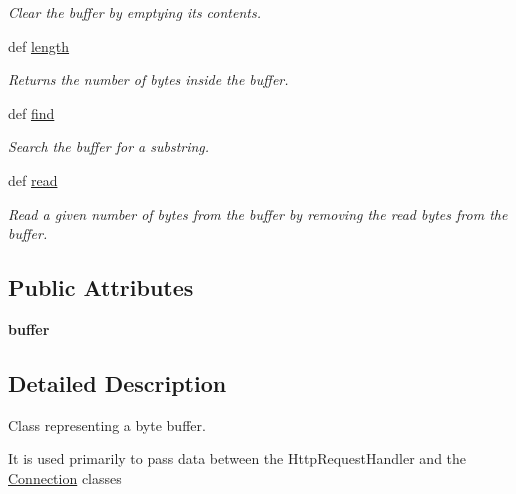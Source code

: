 \begin{DoxyCompactItemize}
\begin{DoxyCompactList}\small\item\em Clear the buffer by emptying its contents. \end{DoxyCompactList}\item 
def \hyperlink{class_connection_manager_1_1_buffer_ae3d52408d0580093d8e7fdcb33a08d73}{length}
\begin{DoxyCompactList}\small\item\em Returns the number of bytes inside the buffer. \end{DoxyCompactList}\item 
def \hyperlink{class_connection_manager_1_1_buffer_a19dfa227ce76299c4b322be6c2fc6673}{find}
\begin{DoxyCompactList}\small\item\em Search the buffer for a substring. \end{DoxyCompactList}\item 
def \hyperlink{class_connection_manager_1_1_buffer_a08de35576de23a84dcd331a5154650bf}{read}
\begin{DoxyCompactList}\small\item\em Read a given number of bytes from the buffer by removing the read bytes from the buffer. \end{DoxyCompactList}\end{DoxyCompactItemize}
\subsection*{Public Attributes}
\begin{DoxyCompactItemize}
\item 
\hypertarget{class_connection_manager_1_1_buffer_a1aa7279467377362cd54f3041e6df72e}{{\bfseries buffer}}\label{class_connection_manager_1_1_buffer_a1aa7279467377362cd54f3041e6df72e}

\end{DoxyCompactItemize}


\subsection{Detailed Description}
Class representing a byte buffer. 

It is used primarily to pass data between the Http\-Request\-Handler and the \hyperlink{class_connection_manager_1_1_connection}{Connection} classes 

